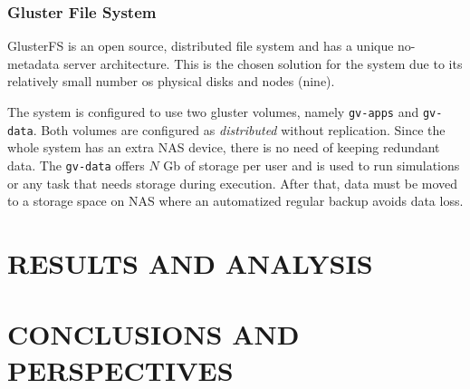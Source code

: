 \documentclass[twoside,a4paper,12pt,english]{inac19}
\begin{document}
\subsubsection{Gluster File System}

GlusterFS\cite{gluster} is an open source, distributed file system and has
a unique no-metadata server architecture. This is the chosen solution for the system due to its relatively
small number os physical disks and nodes (nine).

The system is configured to use two gluster volumes, namely \texttt{gv-apps} and \texttt{gv-data}. Both volumes
are configured as \textit{distributed} without replication. Since the whole system has an extra NAS device, there is
no need of keeping redundant data. The \texttt{gv-data} offers $N$ Gb of storage per user and is used to run simulations or any task that needs storage during execution. After that, data must be moved to a storage space on NAS where an automatized regular backup avoids data loss.



\section{RESULTS AND ANALYSIS}


\section{CONCLUSIONS AND PERSPECTIVES}



\end{document}
